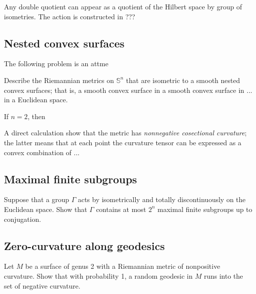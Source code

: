 Any double quotient can appear as a quotient of the Hilbert space by group of isometries.
The action is constructed in ???

\subsection*{Nested convex surfaces}

The following problem is an attme

\begin{pr}
Describe the Riemannian metrics on $\mathbb{S}^n$ that are isometric to a smooth nested convex surfaces;
that is, a smooth convex surface in a smooth convex surface in ... in a Euclidean space.
\end{pr}

If $n=2$, then 

A direct calculation show that the metric has \emph{nonnegative cosectional curvature};
the latter means that at each point the curvature tensor can be expressed as a convex combination of ...

\subsection*{Maximal finite subgroups}

\begin{pr}
Suppose that a group $\Gamma$ acts by isometrically and totally discontinuously on the Euclidean space.
Show that $\Gamma$ contains at most $2^n$ maximal finite subgroups up to conjugation.
\end{pr}

\subsection*{Zero-curvature along geodesics}

\begin{pr}
Let $M$ be a surface of genus 2 with a Riemannian metric of nonpositive curvature.
Show that with probability 1, a random geodesic in $M$ runs into the set of negative curvature.
\end{pr}
